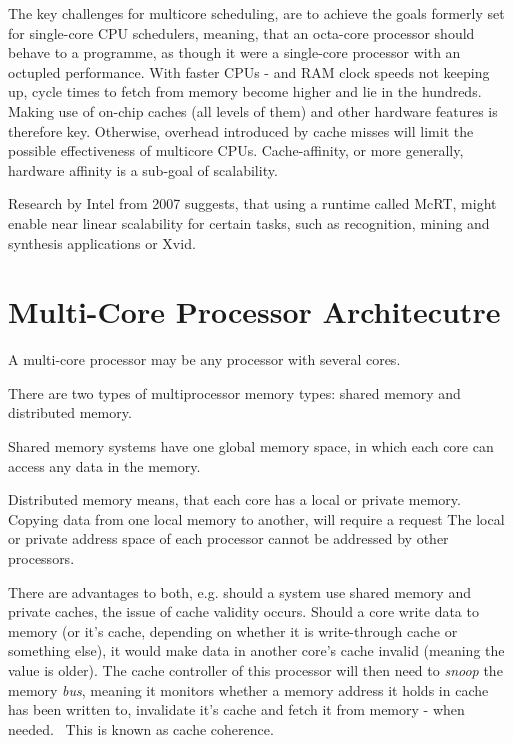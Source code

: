 \documentclass[runningheads]{llncs}
\begin{document}
The key challenges for multicore scheduling, are to achieve the goals formerly set for single-core
CPU schedulers, meaning, that an octa-core processor should behave to a programme, as though it 
were a single-core processor with an octupled performance. With faster CPUs - and RAM clock speeds not
keeping up, cycle times to fetch from memory become higher and lie in the hundreds.~\cite{fedorova-phd}
Making use of on-chip caches (all levels of them) and other hardware features is therefore key.
Otherwise, overhead introduced by cache misses will limit the possible effectiveness of multicore
CPUs. Cache-affinity, or more generally, hardware affinity is a sub-goal of scalability.

Research by Intel from 2007 suggests, that using a runtime called McRT, might enable near linear
scalability for certain tasks, such as recognition, mining and synthesis applications or Xvid.~
\cite{scalability-of-programs-multi-cores}

\section{Multi-Core Processor Architecutre}
A multi-core processor may be any processor with several cores.~\cite{multicore-slides}

There are two types of multiprocessor memory types:
shared memory and distributed memory.

Shared memory systems have one global memory space, in which each core can access any data in the
memory.~\cite{multicore-slides}

Distributed memory means, that each core has a local or private memory. Copying data from one local
memory to another, will require a request The local or private address space of each processor cannot be addressed by other processors.~\cite{multicore-slides}

There are advantages to both, e.g. should a system use shared memory and private caches, the issue
of cache validity occurs. Should a core write data to memory (or it's cache, depending on whether
it is write-through cache or something else), it would make data in another core's cache
invalid (meaning the value is older). The cache controller of this processor will then need to 
\textit{snoop} the memory \textit{bus}, meaning it monitors whether a memory address it holds in cache has been written to, invalidate it's cache and fetch it from memory - when needed.~\cite{ostep} This is known as cache coherence.~\cite{multicore-slides}
\end{document}
